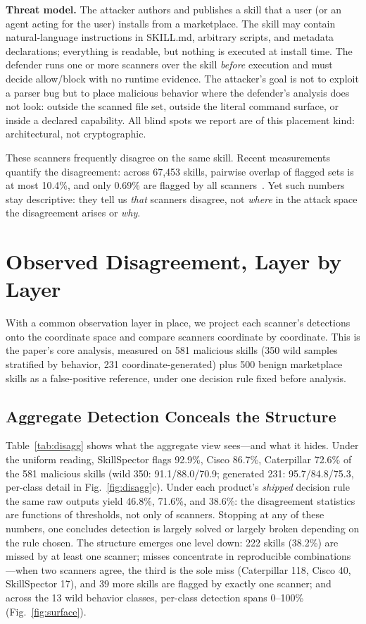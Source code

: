 \documentclass[sigconf,nonacm]{acmart}
\begin{document}
\textbf{Threat model.} The attacker authors and publishes a skill that a user (or an agent acting for the user) installs from a marketplace. The skill may contain natural-language instructions in SKILL.md, arbitrary scripts, and metadata declarations; everything is readable, but nothing is executed at install time. The defender runs one or more scanners over the skill \emph{before} execution and must decide allow/block with no runtime evidence. The attacker's goal is not to exploit a parser bug but to place malicious behavior where the defender's analysis does not look: outside the scanned file set, outside the literal command surface, or inside a declared capability. All blind spots we report are of this placement kind: architectural, not cryptographic.

These scanners frequently disagree on the same skill. Recent measurements quantify the disagreement: across 67{,}453 skills, pairwise overlap of flagged sets is at most 10.4\%, and only 0.69\% are flagged by all scanners~\cite{clawhub2026}. Yet such numbers stay descriptive: they tell us \emph{that} scanners disagree, not \emph{where} in the attack space the disagreement arises or \emph{why}.

\section{Observed Disagreement, Layer by Layer}
\label{sec:explain}

With a common observation layer in place, we project each scanner's detections onto the coordinate space and compare scanners coordinate by coordinate. This is the paper's core analysis, measured on 581 malicious skills (350 wild samples stratified by behavior, 231 coordinate-generated) plus 500 benign marketplace skills as a false-positive reference, under one decision rule fixed before analysis.

\subsection{Aggregate Detection Conceals the Structure}
Table~\ref{tab:disagg} shows what the aggregate view sees---and what it hides. Under the uniform reading, SkillSpector flags 92.9\%, Cisco 86.7\%, Caterpillar 72.6\% of the 581 malicious skills (wild 350: 91.1/88.0/70.9; generated 231: 95.7/84.8/75.3, per-class detail in Fig.~\ref{fig:disagg}c). Under each product's \emph{shipped} decision rule the same raw outputs yield 46.8\%, 71.6\%, and 38.6\%: the disagreement statistics are functions of thresholds, not only of scanners. Stopping at any of these numbers, one concludes detection is largely solved or largely broken depending on the rule chosen. The structure emerges one level down: 222 skills (38.2\%) are missed by at least one scanner; misses concentrate in reproducible combinations---when two scanners agree, the third is the sole miss (Caterpillar 118, Cisco 40, SkillSpector 17), and 39 more skills are flagged by exactly one scanner; and across the 13 wild behavior classes, per-class detection spans 0--100\% (Fig.~\ref{fig:surface}).
\end{document}
